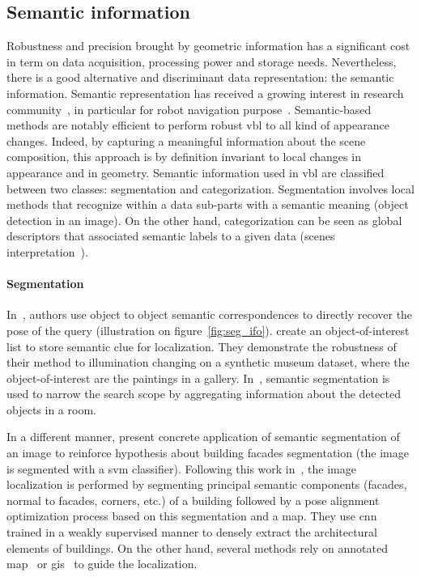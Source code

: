 	\subsection{Semantic information}
		\label{subsec:semantic_info}
		Robustness and precision brought by geometric information has a significant cost in term on data acquisition, processing power and storage needs. Nevertheless, there is a good alternative and discriminant data representation: the semantic information. Semantic representation has received a growing interest in research community~\citep{Liu2016a}, in particular for robot navigation purpose~\citep{Kostavelis2015}. Semantic-based methods are notably efficient to perform robust \ac{vbl} to all kind of appearance changes. Indeed, by capturing a meaningful information about the scene composition, this approach is by definition invariant to local changes in appearance and in geometry. Semantic information used in \ac{vbl} are classified between two classes: segmentation and categorization. Segmentation involves local methods that recognize within a data sub-parts with a semantic meaning (\eg object detection in an image). On the other hand, categorization can be seen as global descriptors that associated semantic labels to a given data (\eg scenes interpretation~\citep{Deng2009}).
		
		\paragraph{Segmentation}
			 In~\citep{Ardeshir2014,Castaldo2015,Christie2016,Weinzaepfel2019}, authors use object to object semantic correspondences to directly recover the pose of the query (illustration on figure~\ref{fig:seg_ifo}). \citet{Weinzaepfel2019} create an object-of-interest list to store semantic clue for localization. They demonstrate the robustness of their method to illumination changing on a synthetic museum dataset, where the object-of-interest are the paintings in a gallery. In~\citep{Lu2015}, semantic segmentation is used to narrow the search scope by aggregating information about the detected objects in a room.

 			 In a different manner, \citet{Arth2015} present concrete application of semantic segmentation of an image to reinforce hypothesis about building facades segmentation (the image is segmented with a \ac{svm} classifier). Following this work in~\citep{Armagan2017a,Armagan2017b,Armagan2017}, the image localization is performed by segmenting principal semantic components (facades, normal to facades, corners, etc.) of a building followed by a pose alignment optimization process based on this segmentation and a map. They use \ac{cnn} trained in a weakly supervised manner to densely extract the architectural elements of buildings. On the other hand, several methods rely on annotated map~\citep{Atanasov2016,Wang2015} or \ac{gis}~\citep{Ardeshir2014,Castaldo2015,Qu2015} to guide the localization.
 			
